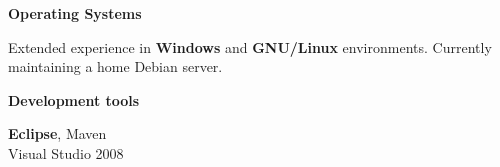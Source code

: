 \documentclass[10pt]{article} %
\newenvironment{indented}[1]%
{\begin{list}{}%
  {\setlength{\leftmargin}{#1}}%
  \item[]%
}
{\end{list}}
\begin{document}
\begin{minipage}[t]{0.5\textwidth}

{\raggedright\normalsize\textbf{Operating Systems}}
\begin{indented}{1cm}
\normalsize{Extended experience in \textbf{Windows} and \textbf{GNU/Linux} environments. Currently maintaining a home Debian server.}
\end{indented}


{\raggedright\textbf{Development tools}}
\begin{indented}{1cm}
\normalsize{\textbf{Eclipse}, Maven} \\
\small{Visual Studio 2008}
\end{indented}



%
%
%
%

\end{minipage} %
\hfill
\end{document}
